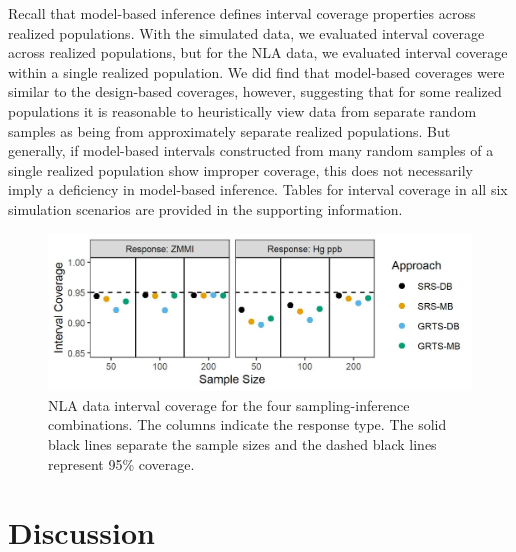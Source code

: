 \documentclass[]{elsarticle} %
\begin{document}
Recall that model-based inference defines interval coverage properties
across realized populations. With the simulated data, we evaluated
interval coverage across realized populations, but for the NLA data, we
evaluated interval coverage within a single realized population. We did
find that model-based coverages were similar to the design-based
coverages, however, suggesting that for some realized populations it is
reasonable to heuristically view data from separate random samples as
being from approximately separate realized populations. But generally,
if model-based intervals constructed from many random samples of a
single realized population show improper coverage, this does not
necessarily imply a deficiency in model-based inference. Tables for
interval coverage in all six simulation scenarios are provided in the
supporting information.

\begin{figure}
  \centering
  \includegraphics[width = 1\linewidth]{figures/data_coverage.jpeg}
  \caption{NLA data interval coverage for the four sampling-inference combinations. The columns indicate the response type. The solid black lines separate the sample sizes and the dashed black lines represent 95\% coverage.}
  \label{fig:data_figconf}
\end{figure}

\hypertarget{sec:discussion}{%
\section{Discussion}\label{sec:discussion}}
\end{document}
